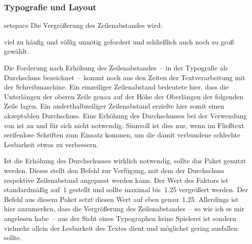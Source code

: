 \subsubsection{Typografie und Layout}
\begin{packages}
%
\item[setspace]%
  Die Vergrößerung des Zeilenabstandes wird:
  \begin{enumerate}[itemindent=0pt,labelwidth=*,labelsep=1em,label=\Roman*.]
  \stditem viel zu häufig und völlig unnötig gefordert und
  \stditem schließlich auch noch zu groß gewählt.
  \end{enumerate}
  Die Forderung nach Erhöhung des Zeilenabstandes~-- in der Typografie als 
  Durchschuss bezeichnet~-- kommt noch aus den Zeiten der Textverarbeitung mit 
  der Schreibmaschine. Ein einzeiliger Zeilenabstand bedeutete hier, dass die 
  Unterlängen der oberen Zeile genau auf der Höhe der Oberlängen der folgenden 
  Zeile lagen. Ein anderthalbzeiliger Zeilenabstand erzielte hier somit einen 
  akzeptablen Durchschuss. Eine Erhöhung des Durchschusses bei der Verwendung 
  von  ist an und für sich nicht notwendig. Sinnvoll ist dies 
  nur, wenn im Fließtext serifenlose Schriften zum Einsatz kommen, um die damit 
  verbundene schlechte Lesbarkeit etwas zu verbessern.
  
  Ist die Erhöhung des Durchschusses wirklich notwendig, sollte das Paket 
   genutzt werden. Dieses stellt den Befehl 
   zur Verfügung, mit dem der Durchschuss 
  respektive Zeilenabstand angepasst werden kann. Der Wert des Faktors ist 
  standardmäßig auf~1 gestellt und sollte maximal bis~1.25 vergrößert werden. 
  Der Befehl  aus diesem Paket setzt diesen Wert auf 
  eben genau~1.25. Allerdings ist hier anzumerken, dass die Vergrößerung des 
  Zeilenabstandes~-- so wie ich es mir angelesen habe~-- aus der Sicht eines 
  Typographen keine Spielerei ist sondern vielmehr allein der Lesbarkeit des 
  Textes dient und möglichst gering ausfallen sollte.
  

\end{packages}

